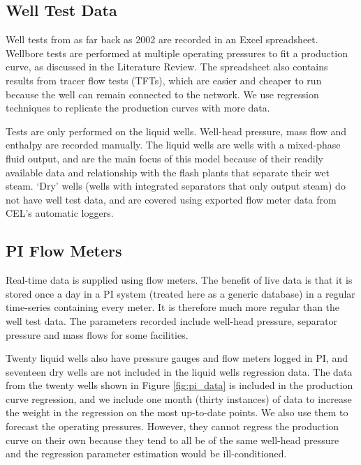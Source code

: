\documentclass[a4paper, 12pt]{article}
\begin{document}
\subsection{Well Test Data}
Well tests from as far back as 2002 are recorded in an Excel spreadsheet. Wellbore tests are performed at multiple operating pressures to fit a production curve, as discussed in the Literature Review. The spreadsheet also contains results from tracer flow tests (TFTs), which are easier and cheaper to run because the well can remain connected to the network. We use regression techniques to replicate the production curves with more data.

Tests are only performed on the liquid wells. Well-head pressure, mass flow and enthalpy are recorded manually. The liquid wells are wells with a mixed-phase fluid output, and are the main focus of this model because of their readily available data and relationship with the flash plants that separate their wet steam.%
`Dry' wells (wells with integrated separators that only output steam) do not have well test data, and are covered using exported flow meter data from CEL's automatic loggers.

\subsection{PI Flow Meters}
Real-time data is supplied using flow meters. The benefit of live data is that it is stored once a day in a PI system (treated here as a generic database) in a regular time-series containing every meter. It is therefore much more regular than the well test data. The parameters recorded include well-head pressure, separator pressure and mass flows for some facilities.


Twenty liquid wells also have pressure gauges and flow meters logged in PI, and seventeen dry wells are not included in the liquid wells regression data. The data from the twenty wells shown in Figure \ref{fig:pi_data} is included in the production curve regression, and we include one month (thirty instances) of data to increase the weight in the regression on the most up-to-date points. We also use them to forecast the operating pressures. However, they cannot regress the production curve on their own because they tend to all be of the same well-head pressure and the regression parameter estimation would be ill-conditioned.
\end{document}
